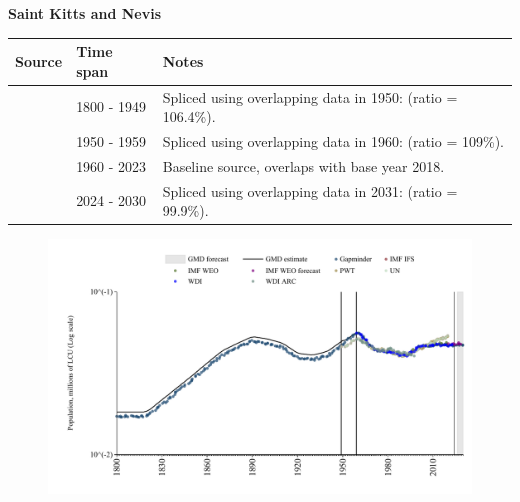 \documentclass[12pt,a4paper,landscape]{article}
\begin{document}
\begin{adjustbox}{max totalsize={\paperwidth}{\paperheight},center}
\begin{minipage}[t][\textheight][t]{\textwidth}
\vspace*{0.5cm}
{}
\begin{center}
{\Large\bfseries Saint Kitts and Nevis}
\end{center}
\vspace{0.5cm}
\begin{table}[H]
\centering
\small
\begin{tabular}{|l|l|l|}
\hline
\textbf{Source} & \textbf{Time span} & \textbf{Notes} \\
\hline
\rowcolor{white}\cite{Gapminder}& 1800 - 1949 &Spliced using overlapping data in 1950: (ratio = 106.4\%).\\
\rowcolor{lightgray}\cite{IMF_IFS}& 1950 - 1959 &Spliced using overlapping data in 1960: (ratio = 109\%).\\
\rowcolor{white}\cite{WDI}& 1960 - 2023 &Baseline source, overlaps with base year 2018.\\
\rowcolor{lightgray}\cite{Gapminder}& 2024 - 2030 &Spliced using overlapping data in 2031: (ratio = 99.9\%).\\
\hline
\end{tabular}
\end{table}
\begin{figure}[H]
\centering
\includegraphics[width=\textwidth,height=0.6\textheight,keepaspectratio]{graphs/KNA_pop.pdf}
\end{figure}
\end{minipage}
\end{adjustbox}
\end{document}
